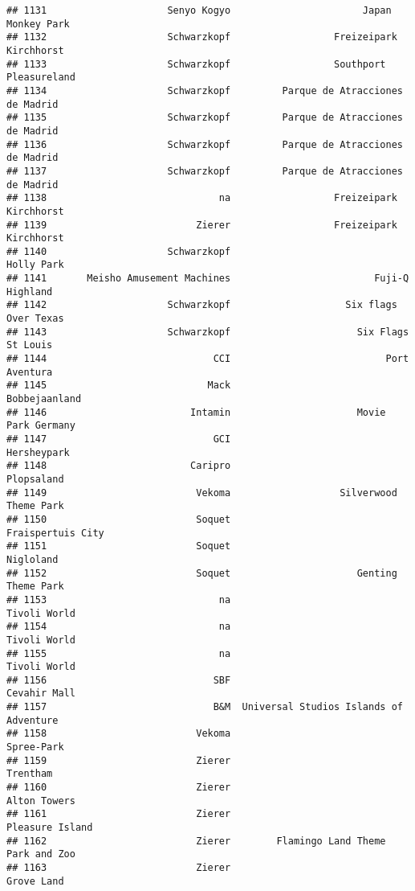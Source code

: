 \documentclass[
]{article}
\begin{document}
\begin{verbatim}
## 1131                     Senyo Kogyo                       Japan Monkey Park
## 1132                     Schwarzkopf                  Freizeipark Kirchhorst
## 1133                     Schwarzkopf                  Southport Pleasureland
## 1134                     Schwarzkopf         Parque de Atracciones de Madrid
## 1135                     Schwarzkopf         Parque de Atracciones de Madrid
## 1136                     Schwarzkopf         Parque de Atracciones de Madrid
## 1137                     Schwarzkopf         Parque de Atracciones de Madrid
## 1138                              na                  Freizeipark Kirchhorst
## 1139                          Zierer                  Freizeipark Kirchhorst
## 1140                     Schwarzkopf                              Holly Park
## 1141       Meisho Amusement Machines                         Fuji-Q Highland
## 1142                     Schwarzkopf                    Six flags Over Texas
## 1143                     Schwarzkopf                      Six Flags St Louis
## 1144                             CCI                           Port Aventura
## 1145                            Mack                           Bobbejaanland
## 1146                         Intamin                      Movie Park Germany
## 1147                             GCI                             Hersheypark
## 1148                         Caripro                              Plopsaland
## 1149                          Vekoma                   Silverwood Theme Park
## 1150                          Soquet                       Fraispertuis City
## 1151                          Soquet                               Nigloland
## 1152                          Soquet                      Genting Theme Park
## 1153                              na                            Tivoli World
## 1154                              na                            Tivoli World
## 1155                              na                            Tivoli World
## 1156                             SBF                            Cevahir Mall
## 1157                             B&M  Universal Studios Islands of Adventure
## 1158                          Vekoma                              Spree-Park
## 1159                          Zierer                                Trentham
## 1160                          Zierer                            Alton Towers
## 1161                          Zierer                         Pleasure Island
## 1162                          Zierer        Flamingo Land Theme Park and Zoo
## 1163                          Zierer                              Grove Land

\end{verbatim}
\end{document}
